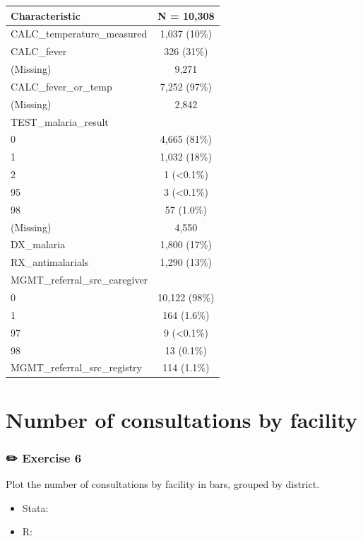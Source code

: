 \documentclass[
  letterpaper,
  DIV=11,
  numbers=noendperiod,
  oneside]{scrreprt}
\providecommand{\tightlist}{%
  \setlength{\itemsep}{0pt}\setlength{\parskip}{0pt}}\usepackage{longtable,booktabs,array}
\begin{document}
\begin{longtable}[]{@{}lc@{}}
\toprule()
\textbf{Characteristic} & \textbf{N = 10,308} \\
\midrule()
\endhead
CALC\_temperature\_measured & 1,037 (10\%) \\
CALC\_fever & 326 (31\%) \\
(Missing) & 9,271 \\
CALC\_fever\_or\_temp & 7,252 (97\%) \\
(Missing) & 2,842 \\
TEST\_malaria\_result & \\
0 & 4,665 (81\%) \\
1 & 1,032 (18\%) \\
2 & 1 (\textless0.1\%) \\
95 & 3 (\textless0.1\%) \\
98 & 57 (1.0\%) \\
(Missing) & 4,550 \\
DX\_malaria & 1,800 (17\%) \\
RX\_antimalarials & 1,290 (13\%) \\
MGMT\_referral\_src\_caregiver & \\
0 & 10,122 (98\%) \\
1 & 164 (1.6\%) \\
97 & 9 (\textless0.1\%) \\
98 & 13 (0.1\%) \\
MGMT\_referral\_src\_registry & 114 (1.1\%) \\
\bottomrule()
\end{longtable}

\hypertarget{number-of-consultations-by-facility}{%
\section{Number of consultations by
facility}\label{number-of-consultations-by-facility}}

\hypertarget{exercise-6-1}{%
\subsubsection{\texorpdfstring{{✏️} Exercise
6}{✏️ Exercise 6}}\label{exercise-6-1}}

Plot the number of consultations by facility in bars, grouped by
district.

\begin{tcolorbox}[enhanced jigsaw, colbacktitle=quarto-callout-tip-color!10!white, titlerule=0mm, breakable, opacityback=0, opacitybacktitle=0.6, left=2mm, coltitle=black, colback=white, title=\textcolor{quarto-callout-tip-color}{\faLightbulb}\hspace{0.5em}{Tip}, rightrule=.15mm, colframe=quarto-callout-tip-color-frame, toprule=.15mm, bottomtitle=1mm, toptitle=1mm, arc=.35mm, bottomrule=.15mm, leftrule=.75mm]

\begin{itemize}
\tightlist
\item
  Stata:
\item
  R:
\end{itemize}

\end{tcolorbox}
\end{document}
